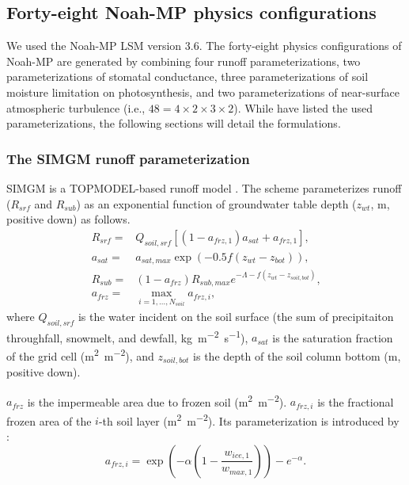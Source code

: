\documentclass[essd]{copernicus}
\begin{document}
\subsection{Forty-eight Noah-MP physics configurations} \label{sec:data:noahmp}

We used the Noah-MP LSM version 3.6. The forty-eight physics configurations of
Noah-MP are generated by combining four runoff parameterizations, two
parameterizations of stomatal conductance, three parameterizations of soil
moisture limitation on photosynthesis, and two parameterizations of near-surface
atmospheric turbulence (i.e., \(48 = 4 \times 2 \times 3 \times 2\)). While
\citet[Table 1]{zheng2019WRR} have listed the used parameterizations, the
following sections will detail the formulations.

\subsubsection{The SIMGM runoff parameterization}

SIMGM is a TOPMODEL-based runoff model \citep{niu2007JGRA}. The scheme
parameterizes runoff (\(R_{srf}\) and \(R_{sub}\)) as an exponential function of
groundwater table depth (\(z_{wt}\), m, positive down) as follows.
\begin{align}
  R_{srf} = & Q_{soil,srf} [(1 - a_{frz,1}) a_{sat} + a_{frz,1} ]
  \text{,} \label{eq:SIMGM:rsrf} \\
  a_{sat} = & a_{sat,max} \exp(-0.5 f (z_{wt} - z_{bot}))
  \text{,} \label{eq:SIMGM:fsat} \\
  R_{sub} = & (1 - a_{frz}) R_{sub,max} e^{-\Lambda - f(z_{wt} - z_{soil,bot})}
  \text{,} \label{eq:SIMGM:rsub} \\
  a_{frz} = & \max_{i=1,\dots,N_{soil}} a_{frz,i}
  \text{,} \label{eq:SIMGM:ffrzmax}
\end{align}
where \(Q_{soil,srf}\) is the water incident on the soil surface (the sum of
precipitaiton throughfall, snowmelt, and dewfall, \si{kg~m^{-2}~s^{-1}}),
\(a_{sat}\) is the saturation fraction of the grid cell (\si{m^2~m^{-2}}), and
\(z_{soil,bot}\) is the depth of the soil column bottom (\si{m}, positive down).

\(a_{frz}\) is the impermeable area due to frozen soil (\si{m^2~m^{-2}}).
\(a_{frz,i}\) is the fractional frozen area of the \(i\)-th soil layer
(\si{m^2~m^{-2}}). Its parameterization is introduced by \citet{niu2006JH}:
\begin{equation}
  a_{frz,i} = \exp\left(-\alpha(1 - \frac{w_{ice,1}}{w_{max,1}})\right) -
  e^{-\alpha} \text{.}
\end{equation}
\end{document}
